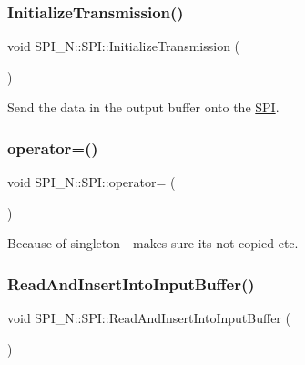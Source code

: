 \subsubsection{\texorpdfstring{Initialize\+Transmission()}{InitializeTransmission()}}
{\footnotesize\ttfamily void S\+P\+I\+\_\+\+N\+::\+S\+P\+I\+::\+Initialize\+Transmission (\begin{DoxyParamCaption}{ }\end{DoxyParamCaption})\hspace{0.3cm}{\ttfamily [private]}}

Send the data in the output buffer onto the \hyperlink{class_s_p_i___n_1_1_s_p_i}{S\+PI}. \hypertarget{class_s_p_i___n_1_1_s_p_i_aabc66612d396c2b70e5cbdba405dbfe5}{}\label{class_s_p_i___n_1_1_s_p_i_aabc66612d396c2b70e5cbdba405dbfe5} 
\subsubsection{\texorpdfstring{operator=()}{operator=()}}
{\footnotesize\ttfamily void S\+P\+I\+\_\+\+N\+::\+S\+P\+I\+::operator= (\begin{DoxyParamCaption}\item[{const \hyperlink{class_s_p_i___n_1_1_s_p_i}{S\+PI} \&}]{ }\end{DoxyParamCaption})\hspace{0.3cm}{\ttfamily [delete]}}

Because of singleton -\/ makes sure its not copied etc. \hypertarget{class_s_p_i___n_1_1_s_p_i_a5f2091bd02e8adbe6814b12fb6e2057f}{}\label{class_s_p_i___n_1_1_s_p_i_a5f2091bd02e8adbe6814b12fb6e2057f} 
\subsubsection{\texorpdfstring{Read\+And\+Insert\+Into\+Input\+Buffer()}{ReadAndInsertIntoInputBuffer()}}
{\footnotesize\ttfamily void S\+P\+I\+\_\+\+N\+::\+S\+P\+I\+::\+Read\+And\+Insert\+Into\+Input\+Buffer (\begin{DoxyParamCaption}{ }\end{DoxyParamCaption})\hspace{0.3cm}{\ttfamily [private]}}

